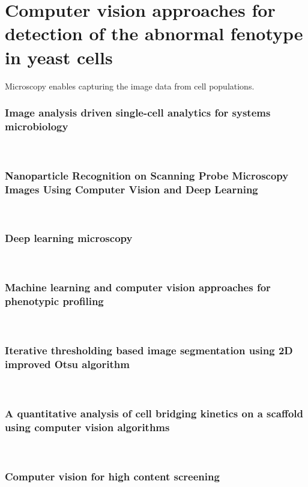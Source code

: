\chapter{Computer vision approaches for detection of the abnormal fenotype in yeast cells}

Microscopy enables capturing the image data from cell populations. 

\subsection{Image analysis driven single-cell analytics for systems microbiology}

~\cite{balomenos2017image}

\subsection{Nanoparticle Recognition on Scanning Probe Microscopy Images Using Computer Vision and Deep Learning}

~\cite{okunev2020nanoparticle}

\subsection{Deep learning microscopy}

~\cite{rivenson2017deep}

\subsection{Machine learning and computer vision approaches for phenotypic profiling}

~\cite{grys2017machine}

\subsection{Iterative thresholding based image segmentation using 2D improved Otsu algorithm}

~\cite{devi2015iterative}

\subsection{A quantitative analysis of cell bridging kinetics on a scaffold using computer vision algorithms}

~\cite{lanaro2021quantitative}

\subsection{Computer vision for high content screening}

